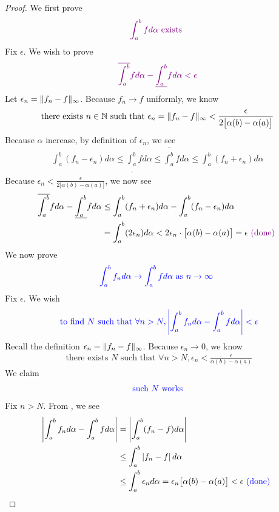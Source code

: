 \documentclass{report}
\begin{document}
\begin{proof}
We first prove 
\begin{align*}
\textcolor{violet}{\int_a^b fd\alpha \text{ exists }}
\end{align*}
Fix $\epsilon $. We wish to prove 
\begin{align*}
\textcolor{violet}{\overline{\int_a^b}fd\alpha - \underline{\int_a^b}fd\alpha < \epsilon }
\end{align*}
Let $\epsilon _n = \| f_n-f \|_\infty$. Because $f_n \to f$ uniformly, we know 
\begin{align*}
\text{ there exists $n\in\mathbb{N}$ such that $\epsilon _n=\| f_n-f \|_\infty < \frac{\epsilon }{2\big[\alpha (b)-\alpha (a) \big]}$ }
\end{align*}
Because $\alpha $ increase, by definition of $\epsilon _n$, we see 
\begin{align*}
\int_a^b (f_n-\epsilon _n)d\alpha \leq \underline{\int_a^b}fd\alpha \leq \overline{\int_a^b}fd\alpha \leq \int_a^b (f_n+\epsilon_n) d\alpha  
\end{align*}
Because $\epsilon _n <\frac{\epsilon}{2\big[\alpha (b)-\alpha (a) \big]}$, we now see 
\begin{align*}
  \overline{\int_a^b}fd\alpha -\underline{\int_a^b}fd\alpha &\leq \int_a^b (f_n+\epsilon _n)d\alpha -\int_a^b (f_n-\epsilon _n)d\alpha \\
&=\int_a^b (2\epsilon _n)d\alpha<2 \epsilon_n \cdot \big[\alpha (b)-\alpha (a) \big] = \epsilon \textcolor{violet}{\text{ (done) }}
\end{align*}
We now prove 
\begin{align*}
  \textcolor{blue}{\int_a^b f_n d\alpha \to \int_a^b fd\alpha \text{ as $n \to \infty $ }}
\end{align*}
Fix $\epsilon $. We wish 
\begin{align*}
\textcolor{blue}{\text{ to find $N$ such that }\forall n>N,\left|\int_a^b f_nd\alpha-\int_a^b fd\alpha \right|<\epsilon  }
\end{align*}
Recall the definition $\epsilon_n= \| f_n-f \|_\infty$. Because $\epsilon _n \to 0$, we know 
\begin{align}
\label{CuU1}
\text{ there exists $N$ such that }\forall n>N, \epsilon_n < \frac{\epsilon }{\alpha (b)-\alpha (a)}
\end{align}
We claim 
\begin{align*}
\textcolor{blue}{\text{ such $N$ works }}
\end{align*}
Fix $n>N$. From , we see
 \begin{align*}
  \left|\int_a^b f_nd\alpha -\int_a^b fd\alpha \right|&=\left|\int_a^b (f_n-f)d\alpha \right|\\
  &\leq \int_a^b \left|f_n-f\right|d\alpha \\
  &\leq \int_a^b \epsilon_n d\alpha =\epsilon_n \big[\alpha (b)-\alpha (a) \big]<\epsilon \textcolor{blue}{\text{ (done) }}
\end{align*}


\end{proof}
\end{document}
